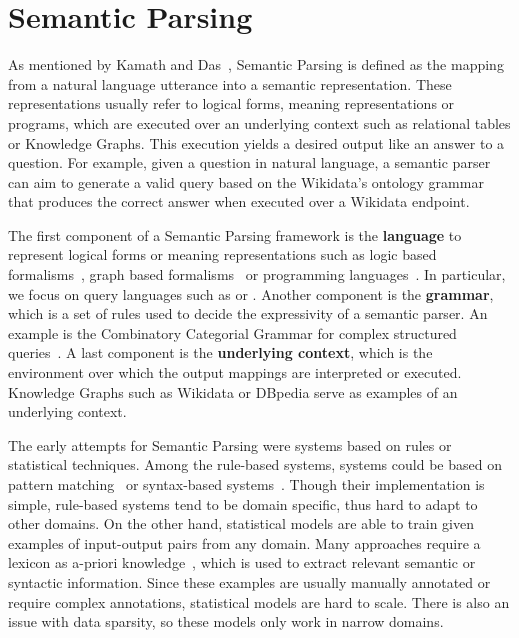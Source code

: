 \section{Semantic Parsing}
\label{cap2:theoFrame/semPar}
As mentioned by Kamath and Das~\cite{semPar:KamathD19}, Semantic Parsing is defined as the 
mapping from a natural language utterance into a semantic representation. These 
representations usually refer to logical forms, meaning representations or programs, which 
are executed over an underlying context such as relational tables or Knowledge Graphs. This 
execution yields a desired output like an answer to a question. For example, given a question 
in natural language, a semantic parser can aim to generate a valid \SPARQL{} query based on the 
Wikidata’s ontology grammar that produces the correct answer when executed over a Wikidata 
endpoint.

The first component of a Semantic Parsing framework is the \textbf{language} to represent 
logical forms or meaning representations such as logic based 
formalisms~\cite{semPar:LiangBLFL16,semPar:ArtziFZ13}, graph based 
formalisms~\cite{semPar:BanarescuBCGGHK13,semPar:OepenKMZCFHU15} or programming 
languages~\cite{semPar:FeurerKESBH15}. In particular, we focus on query languages such as \SQL{} 
or \SPARQL{}. Another component is the \textbf{grammar}, which is a set of rules used to decide the 
expressivity of a semantic parser. An example is the Combinatory Categorial Grammar for complex 
structured queries~\cite{semPar:steedman1996}. A last component is the \textbf{underlying context}, 
which is the environment over which the output mappings are interpreted or executed. Knowledge 
Graphs such as Wikidata or DBpedia serve as examples of an underlying context.

The early attempts for Semantic Parsing were systems based on rules or statistical techniques. 
Among the rule-based systems, systems could be based on pattern matching~\cite{semPar:Johnson84a} 
or syntax-based systems~\cite{semPar:Woods73}. Though their implementation is simple, 
rule-based systems tend to be domain specific, thus hard to adapt to other domains. On the 
other hand, statistical models are able to train given examples of input-output pairs from 
any domain. Many approaches require a lexicon as a-priori 
knowledge~\cite{semPar:ZelleM96, semPar:ThompsonM03}, which is used to extract relevant 
semantic or syntactic information. Since these examples are usually manually annotated or 
require complex annotations, statistical models are hard to scale. There is also an issue 
with data sparsity, so these models only work in narrow domains.

